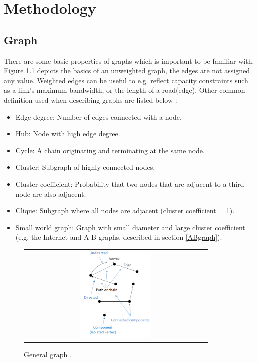 \chapter{Methodology}


\section{Graph}
There are some basic properties of graphs which is important to be familiar with. Figure \ref{fig:generalGraph} depicts the basics of an unweighted graph, the edges are not assigned any value. Weighted edges can be useful to e.g. reflect capacity constraints such as a link's maximum bandwidth, or the length of a road(edge). Other common definition used when describing graphs are listed below \cite{audestad}:
\begin{itemize}
\item Edge degree: Number of edges connected with a node.
\item Hub: Node with high edge degree.
\item Cycle: A chain originating and terminating at the same node.
\item Cluster: Subgraph of highly connected nodes.
\item Cluster coefficient: Probability that two nodes that are adjacent to a third node are also adjacent.
\item Clique: Subgraph where all nodes are adjacent (cluster coefficient = 1).
\item Small world graph: Graph with small diameter and large cluster coefficient (e.g. the Internet and A-B graphs, described in section \ref{ABgraph}).
\end{itemize}

\begin{figure}[h]
\centering
\begin{tabular}{@{}c@{}}
\includegraphics[width=0.4\textwidth]{../Figures/generalGraph.png}
\end{tabular}
\caption{\label{fig:generalGraph} General graph \cite{audestad}.}
\end{figure}


